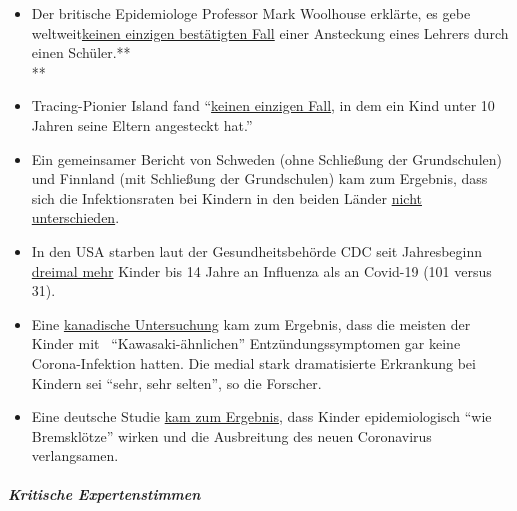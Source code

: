 \begin{itemize}
\tightlist
\item
  Der britische Epidemiologe Professor Mark Woolhouse erklärte, es gebe
  weltweit\href{https://www.thetimes.co.uk/article/no-known-case-of-teacher-catching-coronavirus-from-pupils-says-scientist-3zk5g2x6z}{keinen
  einzigen bestätigten Fall} einer Ansteckung eines Lehrers durch einen
  Schüler.**\\
  **
\item
  Tracing-Pionier Island fand
  ``\href{https://www.sciencemuseumgroup.org.uk/blog/hunting-down-covid-19/}{keinen
  einzigen Fall}, in dem ein Kind unter 10 Jahren seine Eltern
  angesteckt hat.''
\item
  Ein gemeinsamer Bericht von Schweden (ohne Schließung der
  Grundschulen) und Finnland (mit Schließung der Grundschulen) kam zum
  Ergebnis, dass sich die Infektionsraten bei Kindern in den beiden
  Länder
  \href{https://www.reuters.com/article/us-health-coronavirus-sweden-schools-idUSKCN24G2IS}{nicht
  unterschieden}.
\item
  In den USA starben laut der Gesundheitsbehörde CDC seit Jahresbeginn
  \href{https://childrenshealthdefense.org/news/if-covid-fatalities-were-90-2-lower-how-would-you-feel-about-schools-reopening/}{dreimal
  mehr} Kinder bis 14 Jahre an Influenza als an Covid-19 (101 versus
  31).
\item
  Eine
  \href{https://www.theglobeandmail.com/canada/article-new-syndrome-in-children-thought-to-be-linked-to-covid-19-yields/}{kanadische
  Untersuchung} kam zum Ergebnis, dass die meisten der Kinder mit~
  ``Kawasaki-ähnlichen'' Entzündungssymptomen gar keine Corona-Infektion
  hatten. Die medial stark dramatisierte Erkrankung bei Kindern sei
  ``sehr, sehr selten'', so die Forscher.
\item
  Eine deutsche Studie
  \href{https://www.faz.net/aktuell/politik/inland/corona-studie-an-schulen-kinder-eher-bremskloetze-der-infektion-16858827.html}{kam
  zum Ergebnis}, dass Kinder epidemiologisch ``wie Bremsklötze'' wirken
  und die Ausbreitung des neuen Coronavirus verlangsamen.
\end{itemize}

\hypertarget{kritische-expertenstimmen}{%
\subparagraph{\texorpdfstring{\textbf{Kritische
Expertenstimmen}}{Kritische Expertenstimmen}}\label{kritische-expertenstimmen}}

